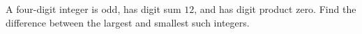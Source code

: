 A four-digit integer is odd, has digit sum $12$, and has digit product zero. Find the difference between the largest and smallest such integers.
